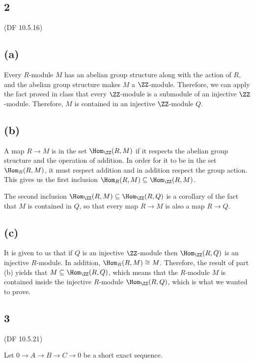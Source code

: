 \documentclass[12pt, reqno]{amsart}
\begin{document}


\subsection*{2} (DF 10.5.16)
\subsection*{(a)}

Every $R$-module $M$ 
has an abelian group structure along with the action of $R$,
and the abelian group structure makes $M$ a $\ZZ$-module. Therefore, we can
apply the fact proved in class that every $\ZZ$-module is a submodule of an
injective $\ZZ$-module.
Therefore, $M$ is contained in an injective $\ZZ$-module $Q$. 

\subsection*{(b)}

A map $R \to M$ is in the set $\Hom_{\ZZ} (R, M)$ if it respects the abelian
group structure and the operation of addition. In order for it to be in the set
$\Hom_R (R, M)$, it must respect addition and in addition respect the group
action. This gives us the first inclusion 
$\Hom_R (R, M) \subseteq \Hom_{\ZZ} (R, M)$.

The second inclusion $\Hom_\ZZ (R, M) \subseteq \Hom_\ZZ (R, Q)$ is a corollary
of the fact that $M$ is contained in $Q$, so that every map $R \to M$ is also a
map $R \to Q$.

\subsection*{(c)}

It is given to us that if $Q$ is an injective $\ZZ$-module then $\Hom_{\ZZ} (R,
Q)$ is an injective $R$-module. In addition, $\Hom_R (R, M) \cong M$.
Therefore, the result of part (b) yields that 
$M \subseteq \Hom_{\ZZ} (R, Q)$, which means that the $R$-module $M$ is
contained inside the injective $R$-module $\Hom_{\ZZ} (R, Q)$, which is what we
wanted to prove.

\subsection*{3} (DF 10.5.21)

Let $0 \to A \to B \to C \to 0$ be a short exact sequence.
\end{document}
